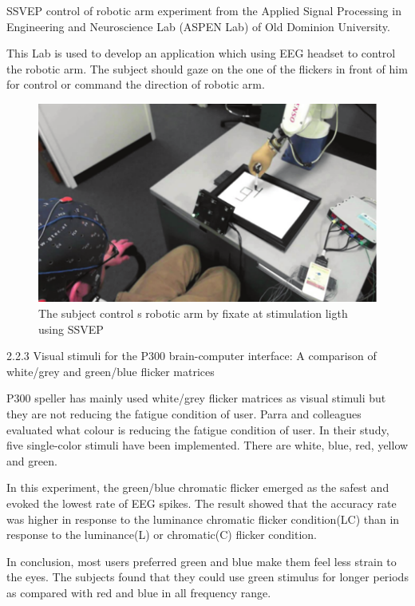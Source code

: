 SSVEP control of robotic arm experiment from the Applied Signal Processing in Engineering and Neuroscience Lab (ASPEN Lab) of Old Dominion University.\par
This Lab is used to develop an application which using EEG headset to control the robotic arm. The subject should gaze on the one of the flickers in front of him for control or command the direction of robotic arm.\\
\begin{figure}[h]
	\centering
  	\includegraphics[scale = 0.70]{picture/22.pdf}
  	\caption{The subject control s robotic arm by fixate at stimulation ligth using SSVEP}
\end{figure}
\newpage

2.2.3	Visual stimuli for the P300 brain-computer interface: A comparison of white/grey and green/blue flicker matrices\cite{vis}

P300 speller has mainly used white/grey flicker matrices as visual stimuli but they are not reducing the fatigue condition of user. Parra and colleagues evaluated what colour is reducing the fatigue condition of user. In their study, five single-color stimuli have been implemented. There are white, blue, red, yellow and green.\par
In this experiment, the green/blue chromatic flicker emerged as the safest and evoked the lowest rate of EEG spikes. The result showed that the accuracy rate was higher in response to the luminance chromatic flicker condition(LC) than in response to the luminance(L) or chromatic(C) flicker condition.

In conclusion, most users preferred green and blue make them feel less strain to the eyes. The subjects found that they could use green stimulus for longer periods as compared with red and blue in all frequency range.

